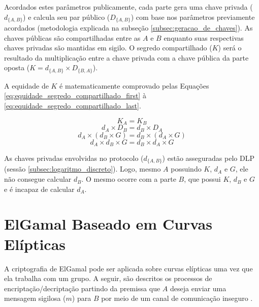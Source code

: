 \documentclass[12pt]{article}
\begin{document}
        Acordados estes parâmetros publicamente, cada parte gera uma chave privada ($d_{\{A, B\}}$) e calcula seu par público ($D_{\{A, B\}}$) com base nos parâmetros previamente acordados (metodologia explicada na subseção \ref{subsec:geracao_de_chaves}). As chaves públicas são compartilhadas entre as $A$ e $B$ enquanto suas respectivas chaves privadas são mantidas em sigilo. O segredo compartilhado ($K$) será o resultado da multiplicação entre a chave privada com a chave pública da parte oposta ($K = d_{\{A, B\}} \times D_{\{B, A\}}$).

        

        A equidade de $K$ é matematicamente comprovado pelas Equações \ref{eq:equidade_segredo_compartilhado_first} à \ref{eq:equidade_segredo_compartilhado_last}.

        \begin{equation}
        \label{eq:equidade_segredo_compartilhado_first}
            K_{A} = K_{B}
        \end{equation}
        \begin{equation}
            d_{A} \times D_{B} = d_{B} \times D_{A}
        \end{equation}
        \begin{equation}
            d_{A} \times (d_{B} \times G) = d_{B} \times (d_{A} \times G)
        \end{equation}
        \begin{equation}
        \label{eq:equidade_segredo_compartilhado_last}
            d_{A} \times d_{B} \times G = d_{B} \times d_{A} \times G
        \end{equation}

        As chaves privadas envolvidas no protocolo ($d_{\{A, B\}}$) estão asseguradas pelo DLP (sessão \ref{subsec:logaritmo_discreto}). Logo, mesmo $A$ possuindo $K$, $d_{A}$ e $G$, ele não consegue calcular $d_{B}$. O mesmo ocorre com a parte $B$, que possui $K$, $d_{B}$ e $G$ e é incapaz de calcular $d_{A}$.

    \section{ElGamal Baseado em Curvas Elípticas}
    \label{sec:elgamal}

        A criptografia de ElGamal pode ser aplicada sobre curvas elípticas uma vez que ela trabalha com um grupo. A seguir, são descritos os processos de encriptação/decriptação partindo da premissa que $A$ deseja enviar uma mensagem sigilosa ($m$) para $B$ por meio de um canal de comunicação inseguro \cite{lara2010curvas}.
\end{document}
